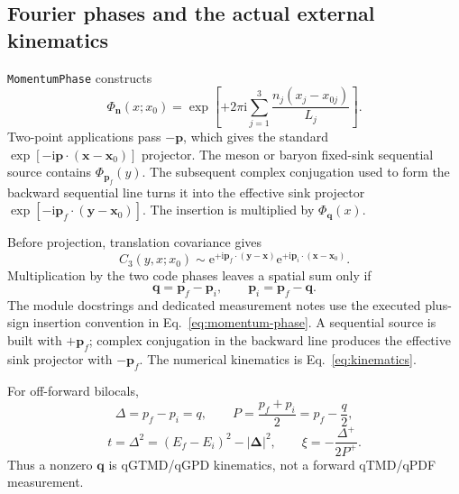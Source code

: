 \documentclass[11pt,a4paper]{article}
\numberwithin{equation}{section}
\newcommand{\ii}{\mathrm{i}}
\newcommand{\ee}{\mathrm{e}}
\newcommand{\abs}[1]{\left|#1\right|}
\newcommand{\code}[1]{%
  \ifmmode\text{\texttt{\detokenize{#1}}}\else\nolinkurl{#1}\fi}
\begin{document}
\subsection{Fourier phases and the actual external kinematics}

\code{MomentumPhase} constructs
\begin{equation}
 \Phi_{\boldsymbol n}(x;x_0)
 =\exp\left[
 +2\pi\ii\sum_{j=1}^{3}
 \frac{n_j(x_j-x_{0j})}{L_j}
 \right].
 \label{eq:momentum-phase}
\end{equation}
Two-point applications pass \(-\boldsymbol p\), which gives the standard
\(\exp[-\ii\boldsymbol p\cdot(\boldsymbol x-\boldsymbol x_0)]\) projector.
The meson or baryon fixed-sink sequential source contains
\(\Phi_{\boldsymbol p_f}(y)\).  The subsequent complex conjugation used to
form the backward sequential line turns it into the effective sink projector
\(\exp[-\ii\boldsymbol p_f\cdot(\boldsymbol y-\boldsymbol x_0)]\).
The insertion is multiplied by \(\Phi_{\boldsymbol q}(x)\).

Before projection, translation covariance gives
\begin{equation}
 C_3(y,x;x_0)\sim
 \ee^{+\ii\boldsymbol p_f\cdot(\boldsymbol y-\boldsymbol x)}
 \ee^{+\ii\boldsymbol p_i\cdot(\boldsymbol x-\boldsymbol x_0)}.
\end{equation}
Multiplication by the two code phases leaves a spatial sum only if
\begin{equation}
 \boxed{\boldsymbol q=\boldsymbol p_f-\boldsymbol p_i,\qquad
        \boldsymbol p_i=\boldsymbol p_f-\boldsymbol q.}
 \label{eq:kinematics}
\end{equation}
The module docstrings and dedicated measurement notes use the executed
plus-sign insertion convention in Eq.~\eqref{eq:momentum-phase}.  A sequential
source is built with \(+\boldsymbol p_f\); complex conjugation in the backward
line produces the effective sink projector with \(-\boldsymbol p_f\).  The
numerical kinematics is Eq.~\eqref{eq:kinematics}.

For off-forward bilocals,
\begin{equation}
 \Delta=p_f-p_i=q,\qquad
 P=\frac{p_f+p_i}{2}=p_f-\frac q2,
 \label{eq:P-Delta}
\end{equation}
\begin{equation}
 t=\Delta^2=(E_f-E_i)^2-\abs{\boldsymbol\Delta}^{2},
 \qquad \xi=-\frac{\Delta^+}{2P^+}.
 \label{eq:t-xi}
\end{equation}
Thus a nonzero \(\boldsymbol q\) is qGTMD/qGPD kinematics, not a forward
qTMD/qPDF measurement.
\end{document}
